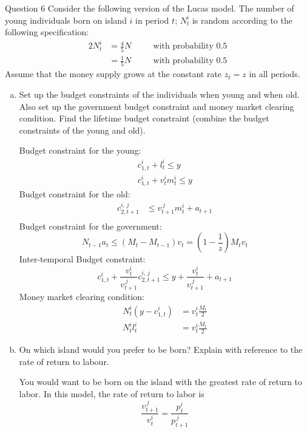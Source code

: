 \documentclass[a4paper]{article}
\newif\IfInSansMode
\numberwithin{equation}{section}
\numberwithin{figure}{section}
\begin{document}
	\begin{questionbox}{Question 6}
		Consider the following version of the Lucas model. The number of young individuals born on island \( i \) in period \( t \); \( N_t^i \) is random according to the following specification:
		\begin{alignat*}{2}
			N_t^i &= \frac{4}{5}N &\quad&\text{with probability 0.5} \\
			&= \frac{1}{5}N &\quad&\text{with probability 0.5}
		\end{alignat*}
		Assume that the money supply grows at the constant rate \( z_t = z \) in all periods.
		\begin{enumerate}[(a)]
			\item Set up the budget constraints of the individuals when young and when old. Also set up the government budget constraint and money market clearing condition. Find the lifetime budget constraint (combine the budget constraints of the young and old).
			\begin{explanationbox}
				Budget constraint for the young:
				\begin{gather*}
					c_{1,t}^i + l_t^i \leq y\\
					c_{1,t}^i +  v_t^i m_t^i \leq y
				\end{gather*}
				Budget constraint for the old:
				\begin{align*}
					c_{2,t+1}^{i,{\,j}} &\leq v_{t+1}^{\,j} m_t^i + a_{t+1^{}}\\
				\end{align*}
				Budget constraint for the government:
				\[
					N_{t-1} a_t \leq (M_t - M_{t-1}) v_t = (1-\frac{1}{z})M_t v_t
				\]
				Inter-temporal Budget constraint:
				\[
					c_{1,t}^i  + \frac{v_t^i}{v_{t+1}^{\,j}}c_{2,t+1}^{i,\,j} \leq y +  \frac{v_t^i}{v_{t+1}^{\,j}} + a_{t+1^{}}
				\]
				Money market clearing condition:
				\begin{align*}
					N_t^i \left( y-c_{1,t}^i \right) &= v_t^i \frac{M_t}{2} \\
					N_t^i l_t^i &= v_t^i\frac{M_t}{2}
				\end{align*}
			\end{explanationbox}
			\item On which island would you prefer to be born? Explain with reference to the rate of return to labour.
			\begin{explanationbox}
				You would want to be born on the island with the greatest rate of return to labor. In this model, the rate of return to labor is
				\[
					\frac{v_{t+1}^{\,j}}{v_t^i} = \frac{p_t^i}{p_{t+1}^{\,j}}
\]
\end{explanationbox}
\end{enumerate}
\end{questionbox}
\end{document}
